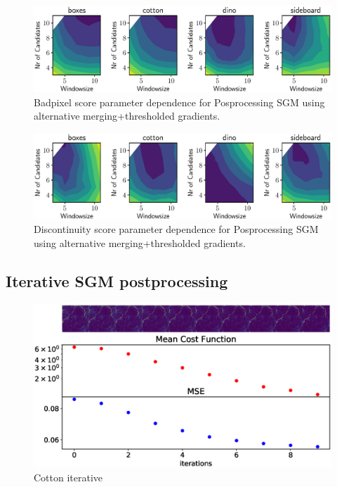 \documentclass  [
  paper    = a4,
  BCOR     = 10mm,
  twoside,
  fontsize = 12pt,
  fleqn,
  toc      = bibnumbered,
  toc      = listofnumbered,
  numbers  = noendperiod,
  headings = normal,
  listof   = leveldown,
  version  = 3.03
]                                       {scrreprt}
\begin{document}
\begin{figure}
	\centering
	\includegraphics[width=1\linewidth]{images/choose_lower_sgm_ppr_contour_badpix_0070}
	\caption[Badpixel Parameter dependence for Posprocessing SGM using alternative merging+thresholded gradients.]{Badpixel score parameter dependence for Posprocessing SGM using alternative merging+thresholded gradients.}
	\label{fig:chooselowersgmpprcontourbadpix_0070}
\end{figure}

\begin{figure}
	\centering
	\includegraphics[width=1\linewidth]{images/choose_lower_sgm_ppr_contour_discontinuities_0070}
	\caption[Discontinuity score Parameter dependence for Posprocessing SGM using alternative merging+thresholded gradients.]{Discontinuity score parameter dependence for Posprocessing SGM using alternative merging+thresholded gradients.}
	\label{fig:chooselowersgmpprcontourbadpixel_discontinuities0070}
\end{figure}
\subsection{Iterative SGM postprocessing}
\begin{figure}
	\centering
	\includegraphics[width=1\linewidth]{images/iteration_cost_cotton}
	\caption[Iterative Improvement of scene \textit{cotton}]{Cotton iterative}
	\label{fig:iterationcostcotton}
\end{figure}
\end{document}
